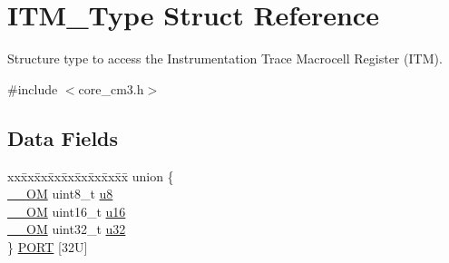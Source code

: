 \hypertarget{struct_i_t_m___type}{}\section{I\+T\+M\+\_\+\+Type Struct Reference}
\label{struct_i_t_m___type}


Structure type to access the Instrumentation Trace Macrocell Register (I\+TM).  




{\ttfamily \#include $<$core\+\_\+cm3.\+h$>$}

\subsection*{Data Fields}
\begin{DoxyCompactItemize}
\item 
\begin{tabbing}
xx\=xx\=xx\=xx\=xx\=xx\=xx\=xx\=xx\=\kill
union \{\\
\>\hyperlink{core__sc300_8h_a0ea2009ed8fd9ef35b48708280fdb758}{\_\_OM} uint8\_t \hyperlink{struct_i_t_m___type_a4c0550e859d614c607bd4b575f05425c}{u8}\\
\>\hyperlink{core__sc300_8h_a0ea2009ed8fd9ef35b48708280fdb758}{\_\_OM} uint16\_t \hyperlink{struct_i_t_m___type_ae93660eefe2482a8564fae9a1ca39739}{u16}\\
\>\hyperlink{core__sc300_8h_a0ea2009ed8fd9ef35b48708280fdb758}{\_\_OM} uint32\_t \hyperlink{struct_i_t_m___type_ae89dd50f788f12863c681fba1a5b60d1}{u32}\\
\} \hyperlink{struct_i_t_m___type_a5d8a5967362b507fd70e4c31ce7c5c3f}{PORT} \mbox{[}32U\mbox{]}\\


\end{tabbing}
\end{DoxyCompactItemize}
